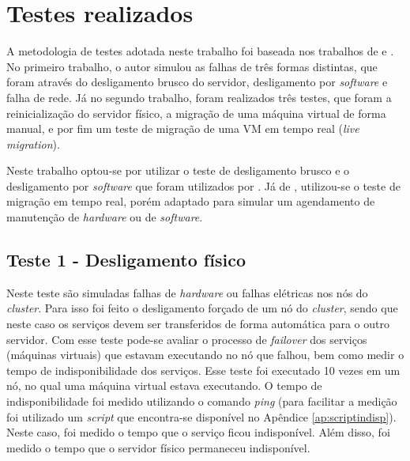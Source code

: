 \newpage
\section{Testes realizados}

A metodologia de testes adotada neste trabalho foi baseada nos trabalhos de \citet{reis2009} e \citet{goncalves2009}. No primeiro trabalho, 
o autor simulou as falhas de três formas distintas, que foram através do desligamento brusco do servidor, desligamento por \textit{software} e 
falha de rede. Já no segundo trabalho, foram realizados três testes, que foram a reinicialização do servidor físico, a migração de uma 
máquina virtual de forma manual, e por fim um teste de migração de uma \ac{VM} em tempo real (\textit{live migration}).

Neste trabalho optou-se por utilizar o teste de desligamento brusco e o desligamento por \textit{software} que foram utilizados por 
\citet{reis2009}. Já de \citet{goncalves2009}, utilizou-se o teste de migração em tempo real, porém adaptado para simular um agendamento de 
manutenção de \textit{hardware} ou de \textit{software}.


\subsection{Teste 1 - Desligamento físico}

Neste teste são simuladas falhas de \textit{hardware} ou falhas elétricas nos nós do \textit{cluster}. Para isso foi feito o desligamento 
forçado de um nó do \textit{cluster}, sendo que neste caso os serviços devem ser transferidos de forma automática para o outro servidor. 
Com esse teste pode-se avaliar o processo de \textit{failover} dos serviços (máquinas virtuais) que estavam executando no nó que falhou, bem como 
medir o tempo de indisponibilidade dos serviços. Esse teste foi executado 10 vezes em um nó, no qual uma máquina virtual estava executando. 
O tempo de indisponibilidade foi medido utilizando o comando \textit{ping} (para facilitar a medição foi utilizado um \textit{script} que 
encontra-se disponível no Apêndice \ref{ap:scriptindisp}). Neste caso, foi medido o tempo que o serviço ficou indisponível. Além disso, 
foi medido o tempo que o servidor físico permaneceu indisponível.

